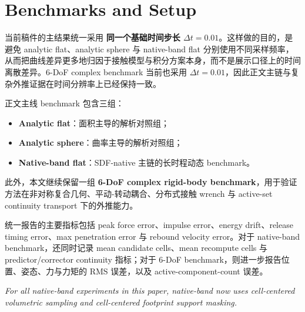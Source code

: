 \section{Benchmarks and Setup}
当前稿件的主结果统一采用 \textbf{同一个基础时间步长 $\Delta t = 0.01$}。这样做的目的，是避免 analytic flat、analytic sphere 与 native-band flat 分别使用不同采样频率，从而把曲线差异更多地归因于接触模型与积分方案本身，而不是展示口径上的时间离散差异。6-DoF complex benchmark 当前也采用 $\Delta t = 0.01$，因此正文主链与复杂外推证据在时间分辨率上已经保持一致。

正文主线 benchmark 包含三组：
\begin{itemize}
    \item \textbf{Analytic flat}：面积主导的解析对照组；
    \item \textbf{Analytic sphere}：曲率主导的解析对照组；
    \item \textbf{Native-band flat}：SDF-native 主链的长时程动态 benchmark。
\end{itemize}
此外，本文继续保留一组 \textbf{6-DoF complex rigid-body benchmark}，用于验证方法在非对称复合几何、平动-转动耦合、分布式接触 wrench 与 active-set continuity transport 下的外推能力。

统一报告的主要指标包括 peak force error、impulse error、energy drift、release timing error、max penetration error 与 rebound velocity error。对于 native-band benchmark，还同时记录 mean candidate cells、mean recompute cells 与 predictor/corrector continuity 指标；对于 6-DoF benchmark，则进一步报告位置、姿态、力与力矩的 RMS 误差，以及 active-component-count 误差。

\noindent\textit{For all native-band experiments in this paper, native-band now uses cell-centered volumetric sampling and cell-centered footprint support masking.}
